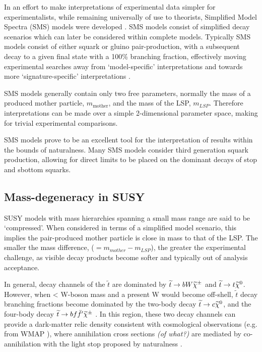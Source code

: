 In an effort to make interpretations of experimental data simpler for
experimentalists, while remaining universally of use to theorists,
Simplified Model Spectra (SMS) models were developed \cite{PhysRevD.79.075020}.
SMS models consist of simplified
decay scenarios which can later be considered within complete models.
Typically SMS models consist of either squark or gluino pair-production, with a
subsequent decay to a given final state with a 100\% branching fraction,
effectively moving
experimental searches away from `model-specific' interpretations and
towards more `signature-specific' interpretations \cite{PhysRevD.88.052017}.

SMS models generally contain only two free parameters, normally the mass of a
produced mother particle, $m_{\text{mother}}$, and the mass of the LSP,
$m_{LSP}$. Therefore interpretations can be made over a simple 2-dimensional
parameter space, making for trivial experimental comparisons.


SMS models prove to be an excellent tool for the interpretation of results
within the bounds of naturalness. Many SMS models consider third generation
squark production, allowing for direct limits to be placed on the dominant
decays of stop and sbottom squarks.

\subsection{Mass-degeneracy in SUSY}
SUSY models with mass hierarchies spanning a small mass range are said to be
`compressed'. When considered in terms of a simplified model scenario, this
implies the pair-produced mother particle is close in mass to that of the LSP.
The
smaller the mass difference, \deltam ($= m_{mother} - m_{LSP}$), the greater the
experimental challenge, as visible
decay products become softer and typically out of analysis acceptance.

In general, decay channels of the $\tilde{t}$ are dominated by $\widetilde{t}\rightarrow
bW\widetilde{\chi}^{\pm}$ and
$\widetilde{t}\rightarrow t\widetilde{\chi}^{0}$. However, when \deltam < W-boson
mass and a present W would become off-shell, $\tilde{t}$ decay branching
fractions
become
dominated by the two-body decay $\widetilde{t}\rightarrow c\widetilde{\chi}^{0}$, and the four-body decay
$\widetilde{t}\rightarrow bf\bar{f}'\widetilde{\chi}^{\pm}$ \cite{Boehm:1999tr}. In this region, these two decay
channels can provide a dark-matter relic density consistent with cosmological
observations (e.g. from WMAP \cite{Spergel:2003cb}), where annihilation cross
sections \emph{(of what?)}
are mediated by co-annihilation with the light stop proposed by naturalness
\cite{Balazs:2004bu}.

